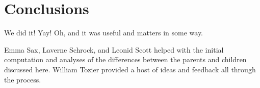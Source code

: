 \section{Conclusions}
\label{sec:conclusions}

We did it! Yay! Oh, and it was useful and matters in some way.

\begin{acknowledgement}
	Emma Sax, Laverne Schrock, and Leonid Scott helped 
	with the initial computation and analyses of the differences between the 
	parents and children discussed here. William Tozier provided a host of 
	ideas and feedback all through the process.
\end{acknowledgement}



